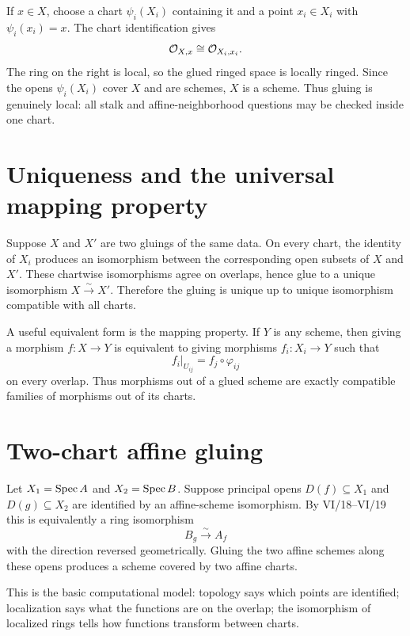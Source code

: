 If $x\in X$, choose a chart $\psi_i(X_i)$ containing it and a point $x_i\in X_i$ with
$\psi_i(x_i)=x$.  The chart identification gives
\[
\mathcal O_{X,x}\cong\mathcal O_{X_i,x_i}.
\]
The ring on the right is local, so the glued ringed space is locally ringed.  Since the opens
$\psi_i(X_i)$ cover $X$ and are schemes, $X$ is a scheme.  Thus gluing is genuinely local:
all stalk and affine-neighborhood questions may be checked inside one chart.



\section{Uniqueness and the universal mapping property}

Suppose $X$ and $X'$ are two gluings of the same data.  On every chart, the identity of $X_i$
produces an isomorphism between the corresponding open subsets of $X$ and $X'$.  These chartwise
isomorphisms agree on overlaps, hence glue to a unique isomorphism $X\xrightarrow{\sim}X'$.
Therefore the gluing is unique up to unique isomorphism compatible with all charts.

A useful equivalent form is the mapping property.  If $Y$ is any scheme, then giving a morphism
$f:X\to Y$ is equivalent to giving morphisms $f_i:X_i\to Y$ such that
\[
f_i|_{U_{ij}}=f_j\circ\varphi_{ij}
\]
on every overlap.  Thus morphisms out of a glued scheme are exactly compatible families of
morphisms out of its charts.



\section{Two-chart affine gluing}

Let $X_1=\operatorname{Spec} A$ and $X_2=\operatorname{Spec} B$.  Suppose principal opens
$D(f)\subseteq X_1$ and $D(g)\subseteq X_2$ are identified by an affine-scheme isomorphism.
By VI/18--VI/19 this is equivalently a ring isomorphism
\[
B_g\xrightarrow{\sim}A_f
\]
with the direction reversed geometrically.  Gluing the two affine schemes along these opens
produces a scheme covered by two affine charts.

This is the basic computational model: topology says which points are identified; localization
says what the functions are on the overlap; the isomorphism of localized rings tells how functions
transform between charts.

